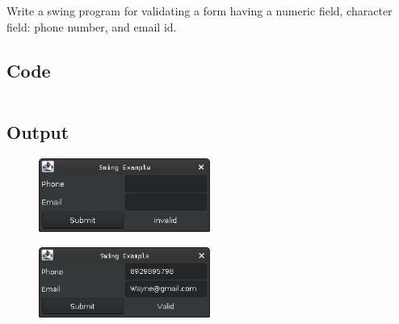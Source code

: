 \documentclass[../main.tex]{subfiles}
\begin{document}
Write a swing program for validating a form having a numeric field, character
field: phone number, and email id.

\subsection{Code}
\inputminted[frame=lines, breaklines, breakanywhere, numberblanklines=false]{java}{./programs/prog11/Swing.java}

\subsection{Output}
\begin{figure}[h!]
	\centering
	\includegraphics[width=0.5\textwidth]{./assets/p11-s1.png}
\end{figure}
\begin{figure}[h!]
	\centering
	\includegraphics[width=0.5\textwidth]{./assets/p11-s2.png}
\end{figure}
\end{document}
